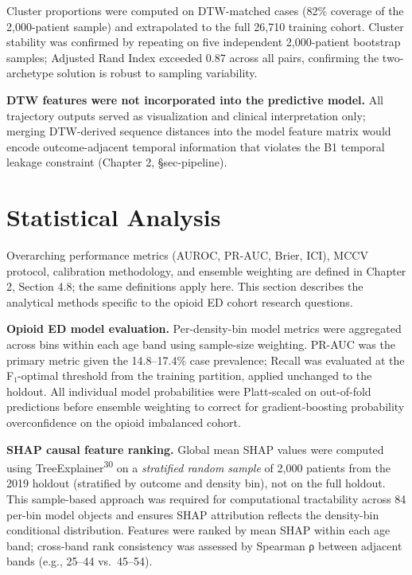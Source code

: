 \documentclass[
  12pt,
]{book}
\begin{document}
Cluster proportions were computed on DTW-matched cases (82\% coverage of
the 2,000-patient sample) and extrapolated to the full 26,710 training
cohort. Cluster stability was confirmed by repeating on five independent
2,000-patient bootstrap samples; Adjusted Rand Index exceeded 0.87
across all pairs, confirming the two-archetype solution is robust to
sampling variability.

\textbf{DTW features were not incorporated into the predictive model.}
All trajectory outputs served as visualization and clinical
interpretation only; merging DTW-derived sequence distances into the
model feature matrix would encode outcome-adjacent temporal information
that violates the B1 temporal leakage constraint (Chapter 2,
§sec-pipeline).

\section{Statistical Analysis}\label{statistical-analysis-1}

Overarching performance metrics (AUROC, PR-AUC, Brier, ICI), MCCV
protocol, calibration methodology, and ensemble weighting are defined in
Chapter 2, Section 4.8; the same definitions apply here. This section
describes the analytical methods specific to the opioid ED cohort
research questions.

\textbf{Opioid ED model evaluation.} Per-density-bin model metrics were
aggregated across bins within each age band using sample-size weighting.
PR-AUC was the primary metric given the 14.8--17.4\% case prevalence;
Recall was evaluated at the F₁-optimal threshold from the training
partition, applied unchanged to the holdout. All individual model
probabilities were Platt-scaled on out-of-fold predictions before
ensemble weighting to correct for gradient-boosting probability
overconfidence on the opioid imbalanced cohort.

\textbf{SHAP causal feature ranking.} Global mean
\textbar SHAP\textbar{} values were computed using
TreeExplainer\textsuperscript{30} on a \emph{stratified random sample}
of 2,000 patients from the 2019 holdout (stratified by outcome and
density bin), not on the full holdout. This sample-based approach was
required for computational tractability across 84 per-bin model objects
and ensures SHAP attribution reflects the density-bin conditional
distribution. Features were ranked by mean \textbar SHAP\textbar{}
within each age band; cross-band rank consistency was assessed by
Spearman ρ between adjacent bands (e.g., 25--44 vs.~45--54).
\end{document}
